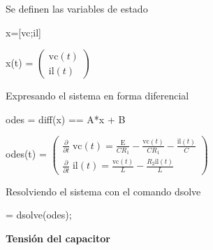\documentclass[10pt,a4paper]{article} %
\begin{document}
\begin{par}
	\begin{flushleft}
		Se definen las variables de estado
	\end{flushleft}
\end{par}

\begin{matlabcode}
	x=[vc;il]
\end{matlabcode}
\begin{matlabsymbolicoutput}
	x(t) = 
	$\displaystyle \left(\begin{array}{c}
	\textrm{vc}\left(t\right)\\
	\textrm{il}\left(t\right)
	\end{array}\right)$
\end{matlabsymbolicoutput}

\begin{par}
	\begin{flushleft}
		Expresando el sistema en forma diferencial
	\end{flushleft}
\end{par}

\begin{matlabcode}
	odes = diff(x) ==  A*x + B
\end{matlabcode}
\begin{matlabsymbolicoutput}
	odes(t) = 
	$\displaystyle \left(\begin{array}{c}
	\frac{\partial }{\partial t}\;\textrm{vc}\left(t\right)=\frac{\textrm{E}}{C R_1 }-\frac{\textrm{vc}\left(t\right)}{C R_1 }-\frac{\textrm{il}\left(t\right)}{C}\\
	\frac{\partial }{\partial t}\;\textrm{il}\left(t\right)=\frac{\textrm{vc}\left(t\right)}{L}-\frac{R_2  \textrm{il}\left(t\right)}{L}
	\end{array}\right)$
\end{matlabsymbolicoutput}

\begin{par}
	\begin{flushleft}
		Resolviendo el sistema con el comando dsolve
	\end{flushleft}
\end{par}

\begin{matlabcode}
	 = dsolve(odes);
\end{matlabcode}

\begin{par}
	\begin{flushleft}
		\textbf{Tensión del capacitor}
	\end{flushleft}
\end{par}
\end{document}
